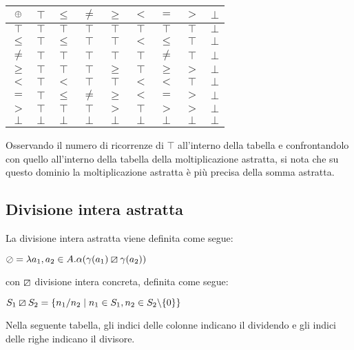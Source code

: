 \begin{center}
	\begin{tabular}{| c | c | c | c | c | c | c | c | c | }
		\hline
		$\mathbin{\oplus}$ & $\top$ & $\leq$ & $\neq$ & $\geq$ & $<$ & $=$ & $>$ & $\bot$ \\
		\hline
		$\top$ & $\top$ & $\top$ & $\top$ & $\top$ & $\top$ & $\top$ & $\top$ & $\bot$ \\
		\hline
		$\leq$ & $\top$ & $\leq$ & $\top$ & $\top$ & $<$ & $\leq$ & $\top$ & $\bot$\\
		\hline
		$\neq$ & $\top$ & $\top$ & $\top$ & $\top$ & $\top$ & $\neq$ & $\top$ & $\bot$ \\
		\hline
		$\geq$ & $\top$ & $\top$ & $\top$ & $\geq$ & $\top$ & $\geq$ & $>$ & $\bot$\\
		\hline
		$<$ & $\top$ & $<$ & $\top$ & $\top$ & $<$ & $<$ & $\top$ & $\bot$\\
		\hline
		$=$ & $\top$ & $\leq$ & $\neq$ & $\geq$ & $<$ & $=$ & $>$ & $\bot$\\
		\hline
		$>$ & $\top$ & $\top$ & $\top$ & $>$ & $\top$ & $>$ & $>$ & $\bot$ \\
		\hline
		$\bot$ & $\bot$ & $\bot$ & $\bot$ & $\bot$ & $\bot$ & $\bot$ & $\bot$ & $\bot$ \\
		\hline
	\end{tabular}
\end{center}

Osservando il numero di ricorrenze di $\top$ all'interno della tabella e confrontandolo con quello all'interno della tabella della moltiplicazione astratta, si nota che su questo dominio la moltiplicazione astratta è più precisa della somma astratta.

\subsection{Divisione intera astratta}

La divisione intera astratta viene definita come segue:

\begin{center}
	$ \mathbin{\oslash} = \lambda a_1,a_2 \in A . \alpha(\gamma(a_1) \mathbin{\boxslash} \gamma(a_2)) $
\end{center}

con $\mathbin{\boxslash}$ divisione intera concreta, definita come segue:

\begin{center}
	$ S_1 \mathbin{\boxslash} S_2 = \{ n_1 / n_2 \mid n_1 \in S_1, n_2 \in S_2 \backslash \{0\} \} $
\end{center}
Nella seguente tabella, gli indici delle colonne indicano il dividendo e gli indici delle righe indicano il divisore.

